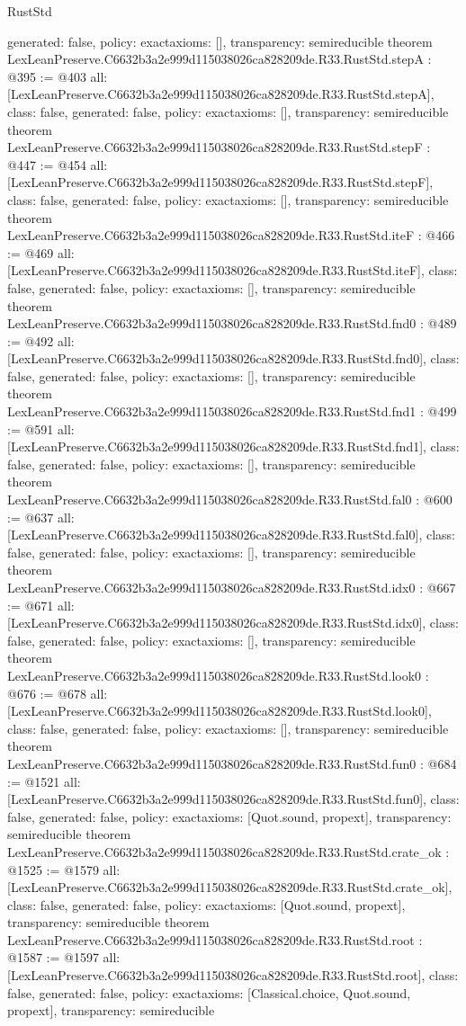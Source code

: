 \begin{lexlean}{RustStd}
\begin{coremodule}
{  generated: false,
  policy: exact{axioms: []},
  transparency: semireducible
}
theorem LexLeanPreserve.C6632b3a2e999d115038026ca828209de.R33.RustStd.stepA : @395 := @403 {
  all: [LexLeanPreserve.C6632b3a2e999d115038026ca828209de.R33.RustStd.stepA],
  class: false,
  generated: false,
  policy: exact{axioms: []},
  transparency: semireducible
}
theorem LexLeanPreserve.C6632b3a2e999d115038026ca828209de.R33.RustStd.stepF : @447 := @454 {
  all: [LexLeanPreserve.C6632b3a2e999d115038026ca828209de.R33.RustStd.stepF],
  class: false,
  generated: false,
  policy: exact{axioms: []},
  transparency: semireducible
}
theorem LexLeanPreserve.C6632b3a2e999d115038026ca828209de.R33.RustStd.iteF : @466 := @469 {
  all: [LexLeanPreserve.C6632b3a2e999d115038026ca828209de.R33.RustStd.iteF],
  class: false,
  generated: false,
  policy: exact{axioms: []},
  transparency: semireducible
}
theorem LexLeanPreserve.C6632b3a2e999d115038026ca828209de.R33.RustStd.fnd0 : @489 := @492 {
  all: [LexLeanPreserve.C6632b3a2e999d115038026ca828209de.R33.RustStd.fnd0],
  class: false,
  generated: false,
  policy: exact{axioms: []},
  transparency: semireducible
}
theorem LexLeanPreserve.C6632b3a2e999d115038026ca828209de.R33.RustStd.fnd1 : @499 := @591 {
  all: [LexLeanPreserve.C6632b3a2e999d115038026ca828209de.R33.RustStd.fnd1],
  class: false,
  generated: false,
  policy: exact{axioms: []},
  transparency: semireducible
}
theorem LexLeanPreserve.C6632b3a2e999d115038026ca828209de.R33.RustStd.fal0 : @600 := @637 {
  all: [LexLeanPreserve.C6632b3a2e999d115038026ca828209de.R33.RustStd.fal0],
  class: false,
  generated: false,
  policy: exact{axioms: []},
  transparency: semireducible
}
theorem LexLeanPreserve.C6632b3a2e999d115038026ca828209de.R33.RustStd.idx0 : @667 := @671 {
  all: [LexLeanPreserve.C6632b3a2e999d115038026ca828209de.R33.RustStd.idx0],
  class: false,
  generated: false,
  policy: exact{axioms: []},
  transparency: semireducible
}
theorem LexLeanPreserve.C6632b3a2e999d115038026ca828209de.R33.RustStd.look0 : @676 := @678 {
  all: [LexLeanPreserve.C6632b3a2e999d115038026ca828209de.R33.RustStd.look0],
  class: false,
  generated: false,
  policy: exact{axioms: []},
  transparency: semireducible
}
theorem LexLeanPreserve.C6632b3a2e999d115038026ca828209de.R33.RustStd.fun0 : @684 := @1521 {
  all: [LexLeanPreserve.C6632b3a2e999d115038026ca828209de.R33.RustStd.fun0],
  class: false,
  generated: false,
  policy: exact{axioms: [Quot.sound, propext]},
  transparency: semireducible
}
theorem LexLeanPreserve.C6632b3a2e999d115038026ca828209de.R33.RustStd.crate_ok : @1525 := @1579 {
  all: [LexLeanPreserve.C6632b3a2e999d115038026ca828209de.R33.RustStd.crate_ok],
  class: false,
  generated: false,
  policy: exact{axioms: [Quot.sound, propext]},
  transparency: semireducible
}
theorem LexLeanPreserve.C6632b3a2e999d115038026ca828209de.R33.RustStd.root : @1587 := @1597 {
  all: [LexLeanPreserve.C6632b3a2e999d115038026ca828209de.R33.RustStd.root],
  class: false,
  generated: false,
  policy: exact{axioms: [Classical.choice, Quot.sound, propext]},
  transparency: semireducible
}


\end{coremodule}
\end{lexlean}
